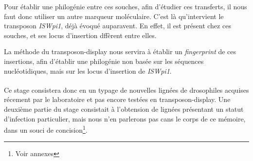 Pour établir une philogénie entre ces souches, afin d’étudier ces transferts, il nous faut donc utiliser un autre marqueur moléculaire. C’est là qu’intervient le transposon \textit{ISWpi1}, déjà évoqué auparavent. En effet, il est présent chez ces souches, et ses locus d’insertion dffèrent entre elles.

La méthode du transposon-display nous servira à établir un \textit{fingerprint} de ces insertions, afin d’établir une philogénie non basée sur les séquences nucléotidiques, mais sur les locus d’insertion de \textit{ISWpi1}.

\paragraph{} %
\label{par:Sujet}
Ce stage consistera donc en un typage de nouvelles lignées de drosophiles acquises récement par le laboratoire et pas encore testées en transposon-display. Une deuxième partie du stage consistait à l’obtension de lignées  présentant un statut d'infection particulier, mais nous n'en parlerons pas cans le corps de ce mémoire, dans un souci de concision\footnote{Voir annexes}.
